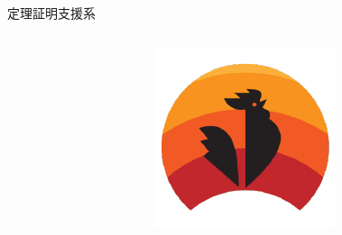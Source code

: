 \documentclass[17pt]{beamer}
\begin{document}
\begin{frame}{定理証明支援系}
\begin{columns}
\begin{column}{0.35\textwidth}
\begin{columns}
\begin{column}{0.4\textwidth}
                \end{column}
                \begin{column}{0.4\textwidth}
                    \includegraphics[width=1\linewidth]{./images/coq.png}
                \end{column}
            \end{columns}
        \end{column}
    \end{columns}


\end{frame}

\end{document}
